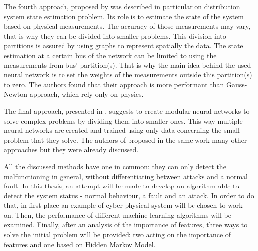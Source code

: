 The fourth approach, proposed by \cite{zamzam_physics-aware_2019} was described in particular on distribution system state estimation problem. Its role is to estimate the state of the system based on physical measurements. The accuracy of those measurements may vary, that is why they can be divided into smaller problems. This division into partitions is assured by using graphs to represent spatially the data.  The state estimation at a certain bus of the network can be limited to using the measurements from bus' partition(s). That is why the main idea behind the used neural network is to set the weights of the measurements outside this partition(s) to zero. The authors found that their approach is more performant than Gauss-Newton approach, which rely only on physics.

The final approach, presented in \cite{karpatne_theory-guided_2017}, suggests to create modular neural networks to solve complex problems by dividing them into smaller ones. This way multiple neural networks are created and trained using only data concerning the small problem that they solve. The authors of \cite{karpatne_theory-guided_2017} proposed in the same work many other approaches but they were already discussed.

All the discussed methods have one in common: they can only detect the malfunctioning in general, without differentiating between attacks and a normal fault. In this thesis, an attempt will be made to develop an algorithm able to detect the system status - normal behaviour, a fault and an attack. In order to do that, in first place an example of cyber physical system will be chosen to work on. Then, the performance of different machine learning algorithms will be examined. Finally, after an analysis of the importance of features, three ways to solve the initial problem will be provided: two acting on the importance of features and one based on Hidden Markov Model.